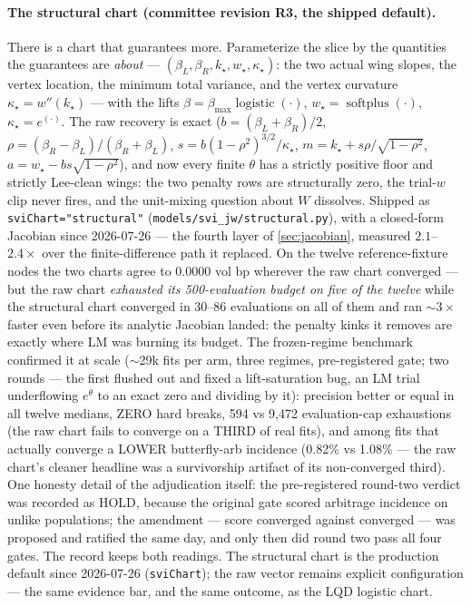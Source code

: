 \documentclass[11pt]{article}
\newcommand{\betL}{\beta_L}
\newcommand{\betR}{\beta_R}
\begin{document}
\paragraph{The structural chart (committee revision R3, the shipped default).}
There is a chart that guarantees more.  Parameterize the slice by the
quantities the guarantees are \emph{about} ---
$(\betL,\betR,k_\star,w_\star,\kappa_\star)$: the two actual wing slopes, the
vertex location, the minimum total variance, and the vertex curvature
$\kappa_\star=w''(k_\star)$ --- with the lifts
$\beta=\beta_{\max}\operatorname{logistic}(\cdot)$,
$w_\star=\operatorname{softplus}(\cdot)$, $\kappa_\star=e^{(\cdot)}$.  The raw
recovery is exact ($b=(\betL+\betR)/2$, $\rho=(\betR-\betL)/(\betR+\betL)$,
$s=b(1-\rho^2)^{3/2}/\kappa_\star$, $m=k_\star+s\rho/\sqrt{1-\rho^2}$,
$a=w_\star-bs\sqrt{1-\rho^2}$), and now every finite $\theta$ has a strictly
positive floor and strictly Lee-clean wings: the two penalty rows are
structurally zero, the trial-$w$ clip never fires, and the unit-mixing
question about $W$ dissolves.  Shipped as \texttt{sviChart="structural"}
(\texttt{models/svi\_jw/structural.py}), with a closed-form Jacobian since
2026-07-26 --- the fourth layer of \cref{sec:jacobian}, measured
$2.1$--$2.4\times$ over the finite-difference path it replaced.
On the twelve reference-fixture nodes the two charts agree to $0.0000$ vol bp
wherever the raw chart converged --- but the raw chart \emph{exhausted its
500-evaluation budget on five of the twelve} while the structural chart
converged in 30--86 evaluations on all of them and ran $\sim3\times$ faster
even before its analytic Jacobian landed: the penalty kinks it removes are
exactly where LM
was burning its budget.  The frozen-regime benchmark confirmed it at scale
($\sim$29k fits per arm, three regimes, pre-registered gate; two rounds ---
the first flushed out and fixed a lift-saturation bug, an LM trial
underflowing $e^{\theta}$ to an exact zero and dividing by it): precision
better or
equal in all twelve medians, ZERO hard breaks, 594 vs 9{,}472
evaluation-cap exhaustions (the raw chart fails to converge on a THIRD of
real fits), and among fits that actually converge a LOWER butterfly-arb
incidence (0.82\% vs 1.08\% --- the raw chart's cleaner headline was a
survivorship artifact of its non-converged third).  One honesty detail of
the adjudication itself: the pre-registered round-two verdict was recorded
as HOLD, because the original gate scored arbitrage incidence on unlike
populations; the amendment --- score converged against converged --- was
proposed and ratified the same day, and only then did round two pass all
four gates.  The record keeps both readings.  The structural chart is
the production default since 2026-07-26 (\texttt{sviChart}); the raw vector
remains explicit configuration --- the same evidence bar, and the same
outcome, as the LQD logistic chart.
\end{document}
